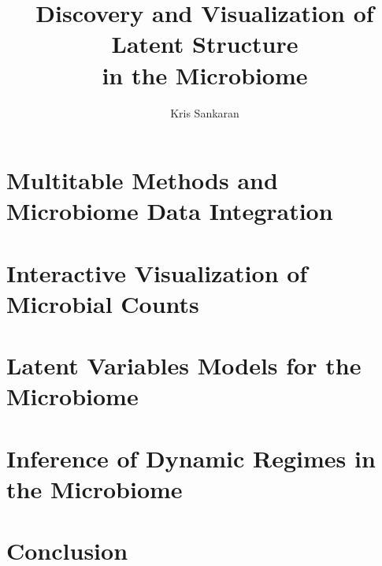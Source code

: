 \documentclass{report}
\title{Discovery and Visualization of Latent Structure \\ in the Microbiome}
\author{Kris Sankaran}
\begin{document}
\maketitle
\tableofcontents

\chapter{Multitable Methods and Microbiome Data Integration}


\chapter{Interactive Visualization of Microbial Counts}


\chapter{Latent Variables Models for the Microbiome}


\chapter{Inference of Dynamic Regimes in the Microbiome}


\chapter{Conclusion}



\end{document}
